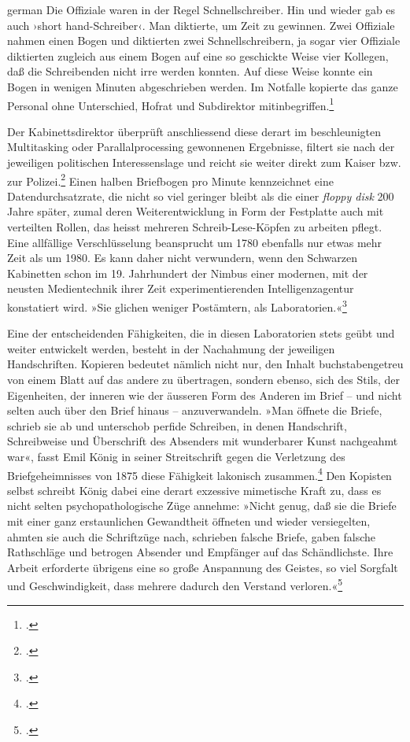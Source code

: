 \documentclass[a4paper,11pt]{article}
\newcommand{\anf}[1]{»#1«}
\newenvironment{zitat}{
\begin{foreigndisplayquote}{german}}%
{\end{foreigndisplayquote}}
\begin{document}
\begin{zitat}
Die Offiziale waren in der Regel Schnellschreiber. Hin und wieder gab es auch ›short hand-Schreiber‹. Man diktierte, um Zeit zu gewinnen. Zwei Offiziale nahmen einen Bogen und diktierten zwei Schnellschreibern, ja sogar vier Offiziale diktierten zugleich aus einem Bogen auf eine so geschickte Weise vier Kollegen, daß die Schreibenden nicht irre werden konnten. Auf diese Weise konnte ein Bogen in wenigen Minuten abgeschrieben werden. Im Notfalle kopierte das ganze Personal ohne Unterschied, Hofrat und Subdirektor mitinbegriffen.\footcite[139]{stix:1937}
\end{zitat}
Der Kabinettsdirektor überprüft anschliessend diese derart im beschleunigten Multitasking oder Parallalprocessing gewonnenen Ergebnisse, filtert sie nach der jeweiligen politischen Interessenslage und reicht sie weiter direkt zum Kaiser bzw. zur Polizei.\footcite[140]{stix:1937} Einen halben Briefbogen pro Minute kennzeichnet eine Datendurchsatzrate, die nicht so viel geringer bleibt als die einer \emph{floppy disk} 200 Jahre später, zumal deren Weiterentwicklung in Form der Festplatte auch mit verteilten Rollen, das heisst mehreren Schreib-Lese-Köpfen zu arbeiten pflegt. Eine allfällige Verschlüsselung beansprucht um 1780 ebenfalls nur etwas mehr Zeit als um 1980. Es kann daher nicht verwundern, wenn den Schwarzen Kabinetten schon im 19. Jahrhundert der Nimbus einer modernen, mit der neusten Medientechnik ihrer Zeit experimentierenden Intelligenzagentur konstatiert wird. \anf{Sie glichen weniger Postämtern, als Laboratorien.}\footcite[40]{koenig:1875}

Eine der entscheidenden Fähigkeiten, die in diesen Laboratorien stets geübt und weiter entwickelt werden, besteht in der Nachahmung der jeweiligen Handschriften. Kopieren bedeutet nämlich nicht nur, den Inhalt buchstabengetreu von einem Blatt auf das andere zu übertragen, sondern ebenso, sich des Stils, der Eigenheiten, der inneren wie der äusseren Form des Anderen im Brief – und nicht selten auch über den Brief hinaus – anzuverwandeln. \anf{Man öffnete die Briefe, schrieb sie ab und unterschob perfide Schreiben, in denen Handschrift, Schreibweise und Überschrift des Absenders mit wunderbarer Kunst nachgeahmt war}, fasst Emil König in seiner Streitschrift gegen die Verletzung des Briefgeheimnisses von 1875 diese Fähigkeit lakonisch zusammen.\footcite[34]{koenig:1875} Den Kopisten selbst schreibt König dabei eine derart exzessive mimetische Kraft zu, dass es nicht selten psychopathologische Züge annehme: \anf{Nicht genug, daß sie die Briefe mit einer ganz erstaunlichen Gewandtheit öffneten und wieder versiegelten, ahmten sie auch die Schriftzüge nach, schrieben falsche Briefe, gaben falsche Rathschläge und betrogen Absender und Empfänger auf das Schändlichste. Ihre Arbeit erforderte übrigens eine so große Anspannung des Geistes, so viel Sorgfalt und Geschwindigkeit, dass mehrere dadurch den Verstand verloren.}\footcite[38]{koenig:1875} 
\end{document}
